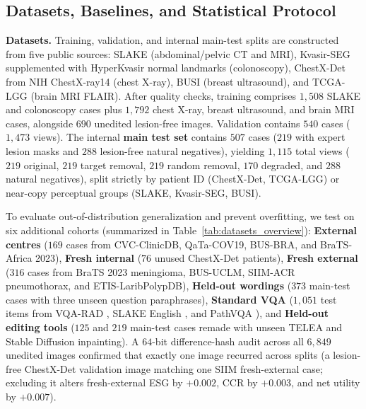 \documentclass{article} %
\begin{document}
\subsection{Datasets, Baselines, and Statistical Protocol}
\label{subsec:exp_setup}
\textbf{Datasets.} Training, validation, and internal main-test splits are constructed from five public sources: SLAKE \citep{liu2021slake} (abdominal/pelvic CT and MRI), Kvasir-SEG \citep{jha2020kvasir} supplemented with HyperKvasir \citep{borgli2020hyperkvasir} normal landmarks (colonoscopy), ChestX-Det \citep{liu2020chestxdet} from NIH ChestX-ray14 (chest X-ray), BUSI \citep{al2020dataset} (breast ultrasound), and TCGA-LGG \citep{buda2019association} (brain MRI FLAIR). After quality checks, training comprises $1,508$ SLAKE and colonoscopy cases plus $1,792$ chest X-ray, breast ultrasound, and brain MRI cases, alongside $690$ unedited lesion-free images. Validation contains $540$ cases ($1,473$ views). The internal \textbf{main test set} contains $507$ cases ($219$ with expert lesion masks and $288$ lesion-free natural negatives), yielding $1,115$ total views ($219$ original, $219$ target removal, $219$ random removal, $170$ degraded, and $288$ natural negatives), split strictly by patient ID (ChestX-Det, TCGA-LGG) or near-copy perceptual groups (SLAKE, Kvasir-SEG, BUSI).

To evaluate out-of-distribution generalization and prevent overfitting, we test on six additional cohorts (summarized in Table~\ref{tab:datasets_overview}): \textbf{External centres} ($169$ cases from CVC-ClinicDB, QaTa-COV19, BUS-BRA, and BraTS-Africa 2023), \textbf{Fresh internal} ($76$ unused ChestX-Det patients), \textbf{Fresh external} ($316$ cases from BraTS 2023 meningioma, BUS-UCLM, SIIM-ACR pneumothorax, and ETIS-LaribPolypDB), \textbf{Held-out wordings} ($373$ main-test cases with three unseen question paraphrases), \textbf{Standard VQA} ($1,051$ test items from VQA-RAD \citep{lau2018vqarad}, SLAKE English \citep{liu2021slake}, and PathVQA \citep{he2020pathvqa}), and \textbf{Held-out editing tools} ($125$ and $219$ main-test cases remade with unseen TELEA \citep{telea2004image} and Stable Diffusion \citep{rombach2022high} inpainting). A $64$-bit difference-hash audit across all $6,849$ unedited images confirmed that exactly one image recurred across splits (a lesion-free ChestX-Det validation image matching one SIIM fresh-external case; excluding it alters fresh-external ESG by $+0.002$, CCR by $+0.003$, and net utility by $+0.007$).
\end{document}
